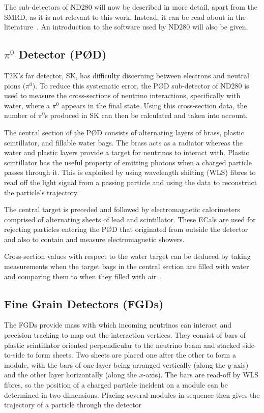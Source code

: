 \documentclass[aps,pra,12pt,notitlepage,tightenlines]{revtex4-1}
\begin{document}
The sub-detectors of ND280 will now be described in more detail, apart from the SMRD, as it is not relevant to this work. Instead, it can be read about in the literature~\cite{Aoki2013}. An introduction to the software used by ND280 will also be given.

\subsection{$\pi^0$ Detector (P\O D)}
T2K's far detector, SK, has difficulty discerning between electrons and neutral pions ($\pi^0$). To reduce this systematic error, the P\O D sub-detector of ND280 is used to measure the cross-sections of neutrino interactions, specifically with water, where a $\pi^0$ appears in the final state. Using this cross-section data, the number of $\pi^0$s produced in SK can then be calculated and taken into account.

The central section of the P\O D consists of alternating layers of brass, plastic scintillator, and fillable water bags. The brass acts as a radiator whereas the water and plastic layers provide a target for neutrinos to interact with. Plastic scintillator has the useful property of emitting photons when a charged particle passes through it. This is exploited by using wavelength shifting (WLS) fibres to read off the light signal from a passing particle and using the data to reconstruct the particle's trajectory. 

The central target is preceded and followed by electromagnetic calorimeters comprised of alternating sheets of lead and scintillator. These ECals are used for rejecting particles entering the P\O D that originated from outside the detector and also to contain and measure electromagnetic showers. 

Cross-section values with respect to the water target can be deduced by taking measurements when the target bags in the central section are filled with water and comparing them to when they filled with air~\cite{ABE2011106, Assylbekov:2011sh}.

\subsection{Fine Grain Detectors (FGDs)}
The FGDs provide mass with which incoming neutrinos can interact and precision tracking to map out the interaction vertices. They consist of bars of plastic scintillator oriented perpendicular to the neutrino beam and stacked side-to-side to form sheets. Two sheets are placed one after the other to form a module, with the bars of one layer being arranged vertically (along the $y$-axis) and the other layer horizontally (along the $x$-axis). The bars are read-off by WLS fibres, so the position of a charged particle incident on a module can be determined in two dimensions. Placing several modules in sequence then gives the trajectory of a particle through the detector
\end{document}
